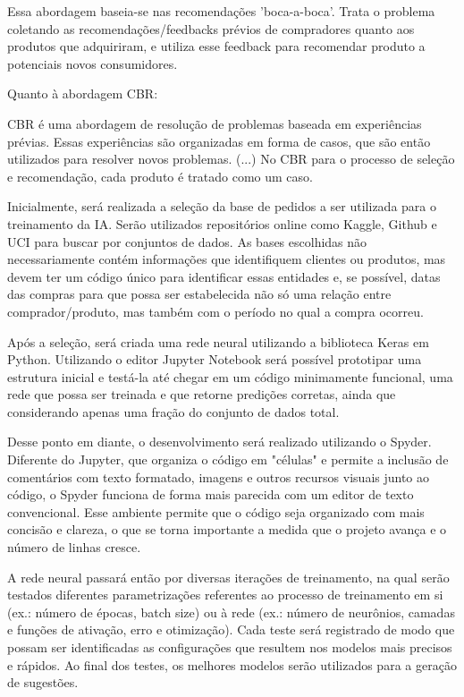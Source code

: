 \begin{citacao}
Essa abordagem baseia-se nas recomendações 'boca-a-boca'. Trata o problema coletando as recomendações/feedbacks prévios de compradores quanto aos produtos que adquiriram, e utiliza esse feedback para recomendar produto a potenciais novos consumidores.
\end{citacao}

Quanto à abordagem CBR:
\begin{citacao}
CBR é uma abordagem de resolução de problemas baseada em experiências prévias. Essas experiências são organizadas em forma de casos, que são então utilizados para resolver novos problemas. (...) No CBR para o processo de seleção e recomendação, cada produto é tratado como um caso.
\end{citacao}

Inicialmente, será realizada a seleção da base de pedidos a ser utilizada para o treinamento da IA. Serão utilizados repositórios online como Kaggle, Github e UCI para buscar por conjuntos de dados. As bases escolhidas não necessariamente contém informações que identifiquem clientes ou produtos, mas devem ter um código único para identificar essas entidades e, se possível, datas das compras para que possa ser estabelecida não só uma relação entre comprador/produto, mas também com o período no qual a compra ocorreu.

Após a seleção, será criada uma rede neural utilizando a biblioteca Keras em Python. Utilizando o editor Jupyter Notebook será possível prototipar uma estrutura inicial e testá-la até chegar em um código minimamente funcional, uma rede que possa ser treinada e que retorne predições corretas, ainda que considerando apenas uma fração do conjunto de dados total. 

Desse ponto em diante, o desenvolvimento será realizado utilizando o Spyder. Diferente do Jupyter, que organiza o código em "células" e permite a inclusão de comentários com texto formatado, imagens e outros recursos visuais junto ao código, o Spyder funciona de forma mais parecida com um editor de texto convencional. Esse ambiente permite que o código seja organizado com mais concisão e clareza, o que se torna importante a medida que o projeto avança e o número de linhas cresce.

A rede neural passará então por diversas iterações de treinamento, na qual serão testados diferentes parametrizações referentes ao processo de treinamento em si (ex.: número de épocas, batch size) ou à rede (ex.: número de neurônios, camadas e funções de ativação, erro e otimização). Cada teste será registrado de modo que possam ser identificadas as configurações que resultem nos modelos mais precisos e rápidos. Ao final dos testes, os melhores modelos serão utilizados para a geração de sugestões.

